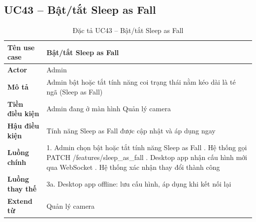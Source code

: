 \subsection*{UC43 -- Bật/tắt Sleep as Fall}
\begin{table}[H]
    \captionsetup{justification=raggedright, singlelinecheck=false}
    \caption{Đặc tả UC43 -- Bật/tắt Sleep as Fall}
\centering
\begin{tabular}{|p{3.5cm}|p{10cm}|}
\hline
\textbf{Tên use case} & Bật/tắt Sleep as Fall \\
\hline
\textbf{Actor} & Admin \\
\hline
\textbf{Mô tả} & Admin bật hoặc tắt tính năng coi trạng
  thái nằm kéo dài là té ngã (Sleep as Fall) \\
\hline
\textbf{Tiền điều kiện} & Admin đang ở màn hình Quản lý camera \\
\hline
\textbf{Hậu điều kiện} & Tính năng Sleep as Fall được
  cập nhật và áp dụng ngay \\
\hline
\textbf{Luồng chính} &
  1. Admin chọn bật hoặc tắt tính năng Sleep as Fall \newline
  2. Hệ thống gọi PATCH /features/sleep\_as\_fall \newline
  3. Desktop app nhận cấu hình mới qua WebSocket \newline
  4. Hệ thống xác nhận thay đổi thành công \\
\hline
\textbf{Luồng thay thế} &
  3a. Desktop app offline: lưu cấu hình, áp dụng khi kết nối lại \\
\hline
\textbf{Extend từ} & Quản lý camera \\
\hline
\end{tabular}

\end{table}

